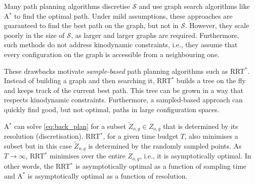 \documentclass[a4paper,11pt]{report}
\begin{document}
Many path planning algorithms discretise $\mathcal{S}$ and use graph search algorithms like A$^*$ to find the optimal path. Under mild assumptions, these approaches are guaranteed to find the best path on the graph, but not in $\mathcal{S}$. However, they scale poorly in the size of $\mathcal{S}$, as larger and larger graphs are required. Furthermore, such methods do not address kinodynamic constraints, i.e., they assume that every configuration on the graph is accessible from a neighbouring one. 

These drawbacks motivate \emph{sample-based} path planning algorithms such as RRT$^*$. Instead of building a graph and then searching it, RRT$^*$ builds a tree on the fly and keeps track of the current best path. This tree can be grown in a way that respects kinodynamic constraints. Furthermore, a sampled-based approach can quickly find good, but not optimal, paths in large configuration spaces.



A$^*$ can solve \eqref{eq:back_plan} for a subset $\tilde{Z}_{o,g} \in  Z_{o,g}$ that is determined by its resolution (discretisation). RRT$^*$, for a given time budget $T$, also minimises a subset but in this case $\tilde{Z}_{o,g}$ is determined by the randomly sampled points. As $T \rightarrow \infty$, RRT$^*$ minimises over the entire $Z_{o,g}$, i.e., it is asymptotically optimal. In other words, the RRT$^*$ is asymptotically optimal as a function of sampling time and A$^*$ is asymptotically optimal as a function of resolution. %
\end{document}
